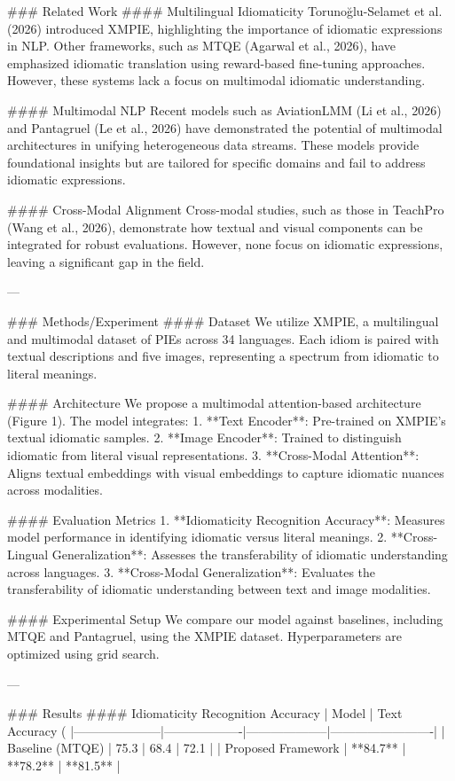 ### Related Work
#### Multilingual Idiomaticity
Torunoğlu-Selamet et al. (2026) introduced XMPIE, highlighting the importance of idiomatic expressions in NLP. Other frameworks, such as MTQE (Agarwal et al., 2026), have emphasized idiomatic translation using reward-based fine-tuning approaches. However, these systems lack a focus on multimodal idiomatic understanding.

#### Multimodal NLP
Recent models such as AviationLMM (Li et al., 2026) and Pantagruel (Le et al., 2026) have demonstrated the potential of multimodal architectures in unifying heterogeneous data streams. These models provide foundational insights but are tailored for specific domains and fail to address idiomatic expressions.

#### Cross-Modal Alignment
Cross-modal studies, such as those in TeachPro (Wang et al., 2026), demonstrate how textual and visual components can be integrated for robust evaluations. However, none focus on idiomatic expressions, leaving a significant gap in the field.

---

### Methods/Experiment
#### Dataset
We utilize XMPIE, a multilingual and multimodal dataset of PIEs across 34 languages. Each idiom is paired with textual descriptions and five images, representing a spectrum from idiomatic to literal meanings.

#### Architecture
We propose a multimodal attention-based architecture (Figure 1). The model integrates:
1. **Text Encoder**: Pre-trained on XMPIE's textual idiomatic samples.
2. **Image Encoder**: Trained to distinguish idiomatic from literal visual representations.
3. **Cross-Modal Attention**: Aligns textual embeddings with visual embeddings to capture idiomatic nuances across modalities.

#### Evaluation Metrics
1. **Idiomaticity Recognition Accuracy**: Measures model performance in identifying idiomatic versus literal meanings.
2. **Cross-Lingual Generalization**: Assesses the transferability of idiomatic understanding across languages.
3. **Cross-Modal Generalization**: Evaluates the transferability of idiomatic understanding between text and image modalities.

#### Experimental Setup
We compare our model against baselines, including MTQE and Pantagruel, using the XMPIE dataset. Hyperparameters are optimized using grid search.

---

### Results
#### Idiomaticity Recognition Accuracy
| Model               | Text Accuracy (%
|---------------------|-------------------|--------------------|-------------------------|
| Baseline (MTQE)     | 75.3             | 68.4              | 72.1                   |
| Proposed Framework  | **84.7**         | **78.2**          | **81.5**               |

